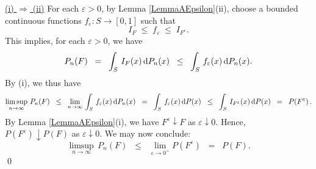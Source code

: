 \proof
\vskip 0.1cm
\noindent
\underline{(i) $\Longrightarrow$ (ii)}
\vskip 0.2cm
\noindent
For each $\varepsilon > 0$, by Lemma \ref{LemmaAEpsilon}(ii), choose
a bounded continuous functions $f_{\varepsilon} : S \longrightarrow [0,1]$ such that
\begin{equation*}
I_{F} \; \leq \; f_{\varepsilon} \; \leq \; I_{F^{\varepsilon}}.
\end{equation*}
This implies, for each $\varepsilon > 0$, we have
\begin{equation*}
P_{n}(F)
\;\; = \;\; \int_{S}\,I_{F}(x)\,\textnormal{d} P_{n}(x)
\;\; \leq \;\; \int_{S}\,f_{\varepsilon}(x)\,\textnormal{d} P_{n}(x).
\end{equation*}
By (i), we thus have
\begin{equation*}
\limsup_{n\rightarrow\infty}\,P_{n}(F)
\;\;\leq\;\; \lim_{n\rightarrow\infty}\,\int_{S}\,f_{\varepsilon}(x)\,\textnormal{d} P_{n}(x)
\;\;=\;\; \int_{S}\,f_{\varepsilon}(x)\,\textnormal{d} P(x)
\;\;\leq\;\; \int_{S}\,I_{F^{\varepsilon}}(x)\,\textnormal{d} P(x)
\;\;=\;\; P\!\left(F^{\varepsilon}\right).
\end{equation*}
By Lemma \ref{LemmaAEpsilon}(i), we have $F^{\varepsilon}\downarrow F$ as $\varepsilon\downarrow 0$.
Hence, $P\!\left(F^{\varepsilon}\right)\downarrow P(F)$ as $\varepsilon\downarrow 0$.
We may now conclude:
\begin{equation*}
\limsup_{n\rightarrow\infty}\,P_{n}(F)
\;\;\leq\;\; \lim_{\varepsilon\rightarrow 0^{+}}P\!\left(F^{\varepsilon}\right)
\;\;=\;\; P\!\left(F\right).
\end{equation*}
\qed

